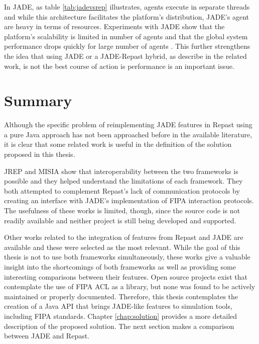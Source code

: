 In JADE, as table \ref{tab:jadevsrep} illustrates, agents execute in separate threads and while this architecture facilitates the platform's distribution, JADE's agent are heavy in terms of resources. Experiments with JADE show that the platform's scalability is limited in number of agents and that the global system performance drops quickly for large number of agents \cite{mengistu2008scalability} \cite{garcia2011misia}. This further strengthens the idea that using JADE or a JADE-Repast hybrid, as describe in the related work, is not the best course of action is performance is an important issue.



\section{Summary}
Although the specific problem of reimplementing JADE features in Repast using a pure Java approach has not been approached before in the available literature, it is clear that some related work is useful in the definition of the solution proposed in this thesis. 

JREP and MISIA show that interoperability between the two frameworks is possible and they helped understand the limitations of each framework. They both attempted to complement Repast's lack of communication protocols by creating an interface with JADE's implementation of FIPA interaction protocols. The usefulness of these works is limited, though, since the source code is not readily available and neither project is still being developed and supported.

Other works related to the integration of features from Repast and JADE are available and these were selected as the most relevant. While the goal of this thesis is not to use both frameworks simultaneously, these works give a valuable insight into the shortcomings of both frameworks as well as providing some interesting comparisons between their features. Open source projects exist that contemplate the use of FIPA ACL as a library, but none was found to be actively maintained or properly documented. Therefore, this thesis contemplates the creation of a Java API that brings JADE-like features to simulation tools, including FIPA standards. Chapter \ref{chap:solution} provides a more detailed description of the proposed solution. The next section makes a comparison between JADE and Repast.